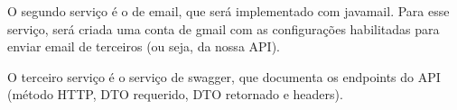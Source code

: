 O segundo serviço é o de email, que será implementado com javamail. Para esse serviço, será criada uma conta de gmail com as configurações habilitadas para enviar email de terceiros (ou seja, da nossa \gls{API}).

O terceiro serviço é o serviço de swagger, que documenta os endpoints do \gls{API} (método HTTP, DTO requerido, DTO retornado e headers).
